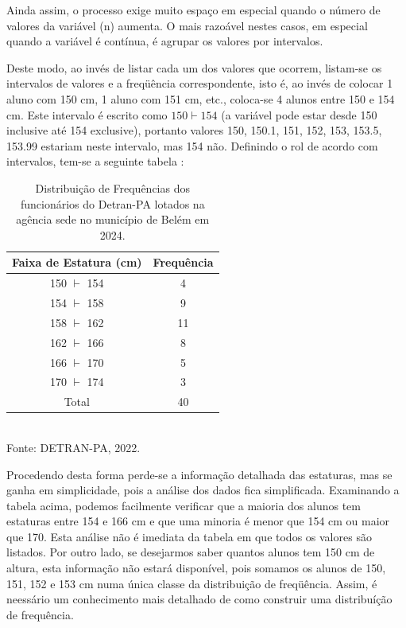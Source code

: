\newpage
Ainda assim, o processo exige muito espaço em especial quando o número de valores da variável (n) aumenta. O mais razoável nestes casos, em especial quando a variável é contínua, é agrupar os valores por intervalos. 

\newpage
Deste modo, ao invés de listar cada um dos valores que ocorrem, listam-se os intervalos de valores e a freqüência correspondente, isto é, ao invés de colocar 1 aluno com 150 cm, 1 aluno com 151 cm, etc., coloca-se 4 alunos entre 150 e 154 cm. Este intervalo é escrito como $150 \vdash 154$ (a variável pode estar desde 150 inclusive até 154 exclusive), portanto valores 150, 150.1, 151, 152, 153, 153.5, 153.99 estariam neste intervalo, mas 154 não. Definindo o rol de acordo com intervalos, tem-se a seguinte tabela :


\begin{table}[!htb]
    \centering
    {
    \caption{Distribuição de Frequências dos funcionários do Detran-PA lotados na agência sede no município de Belém em 2024.}
    \label{estatura2}
    \vspace{0.2cm}
\begin{tabular}{c|c}
\hline\hline
Faixa de Estatura (cm) & Frequência \\
  \hline\hline
  150 $\vdash$ 154 & 4  \\
  154 $\vdash$ 158 & 9 \\
  158 $\vdash$ 162 & 11  \\
  162 $\vdash$ 166 & 8  \\
  166 $\vdash$ 170 & 5  \\
  170 $\vdash$ 174 & 3  \\
  \hline\hline
  Total            & 40  \\
  \hline\hline
\end{tabular}}
\\
\hspace{-2.1cm}
Fonte: DETRAN-PA, 2022.
\end{table}


Procedendo desta forma perde-se a informação detalhada das estaturas, mas se ganha em simplicidade, pois a análise dos dados fica simplificada. Examinando a tabela acima, podemos facilmente verificar que a maioria dos alunos tem estaturas entre 154 e 166 cm e que uma minoria é menor que 154 cm ou maior que 170. Esta análise não é imediata da tabela em que todos os valores são listados. Por outro lado, se desejarmos saber quantos alunos tem 150 cm de altura, esta informação não estará disponível, pois somamos os alunos de 150, 151, 152 e 153 cm numa única classe da distribuição de freqüência. Assim, é neessário um conhecimento mais detalhado de como construir uma distribuíção de frequência.

